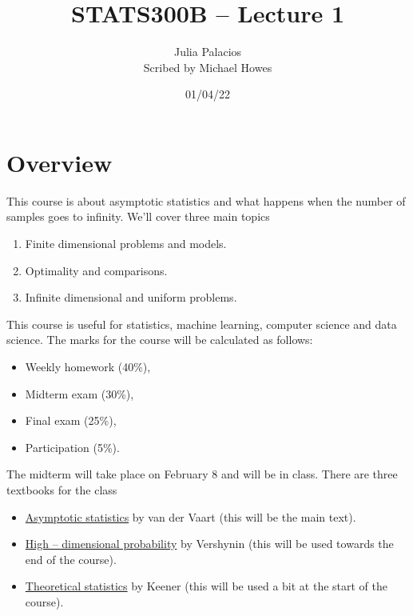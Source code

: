




\title{STATS300B -- Lecture 1}
\author{Julia Palacios\\ Scribed by Michael Howes}
\date{01/04/22}

\pagestyle{fancy}
\fancyhf{}


\maketitle
\tableofcontents
\section{Overview}
This course is about asymptotic statistics and what happens when the number of samples goes to infinity. We'll cover three main topics
\begin{enumerate}
    \item Finite dimensional problems and models.
    \item Optimality and comparisons.
    \item Infinite dimensional and uniform problems.
\end{enumerate}
This course is useful for statistics, machine learning, computer science and data science. The marks for the course will be calculated as follows:
\begin{itemize}
    \item Weekly homework (40\%),
    \item Midterm exam (30\%),
    \item Final exam (25\%),
    \item Participation (5\%).
\end{itemize}
The midterm will take place on February 8 and will be in class. There are three textbooks for the class
\begin{itemize}
    \item \href{https://www.cambridge.org/core/books/asymptotic-statistics/A3C7DAD3F7E66A1FA60E9C8FE132EE1D}{Asymptotic statistics} by van der Vaart (this will be the main text).
    \item \href{https://www.cambridge.org/core/books/highdimensional-probability/797C466DA29743D2C8213493BD2D2102}{High -- dimensional probability} by Vershynin (this will be used towards the end of the course).
    \item \href{https://link.springer.com/book/10.1007/978-0-387-93839-4}{Theoretical statistics} by Keener (this will be used a bit at the start of the course).
\end{itemize}
